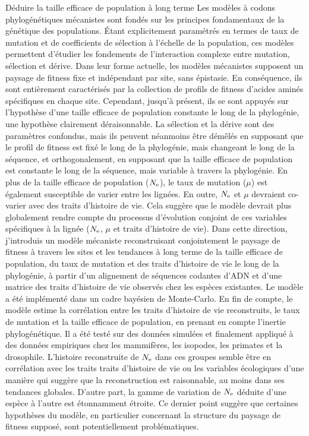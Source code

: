 Déduire la taille efficace de population à long terme
Les modèles à codons phylogénétiques mécanistes sont fondés sur les principes fondamentaux de la génétique des populations.
Étant explicitement paramétrés en termes de taux de mutation et de coefficients de sélection à l'échelle de la population, ces modèles permettent d’étudier les fondements de l'interaction complexe entre mutation, sélection et dérive.
Dans leur forme actuelle, les modèles mécanistes supposent un paysage de fitness fixe et indépendant par site, sans épistasie.
En conséquence, ils sont entièrement caractérisés par la collection de profils de fitness d'acides aminés spécifiques en chaque site.
Cependant, jusqu'à présent, ils se sont appuyés sur l'hypothèse d'une taille efficace de population constante le long de la phylogénie, une hypothèse clairement déraisonnable.
La sélection et la dérive sont des paramètres confondus, mais ils peuvent néanmoins être démêlés en supposant que le profil de fitness est fixé le long de la phylogénie, mais changeant le long de la séquence, et orthogonalement, en supposant que la taille efficace de population est constante le long de la séquence, mais variable à travers la phylogénie.
En plus de la taille efficace de population ($N_{\textrm{e}}$), le taux de mutation ($\mu$) est également susceptible de varier entre les lignées.
En outre, $N_{\textrm{e}}$ et $\mu$ devraient co-varier avec des traits d’histoire de vie.
Cela suggère que le modèle devrait plus globalement rendre compte du processus d'évolution conjoint de ces variables spécifiques à la lignée ($N_{\textrm{e}}$, $\mu$ et traits d’histoire de vie).
Dans cette direction, j'introduis un modèle mécaniste reconstruisant conjointement le paysage de fitness à travers les sites et les tendances à long terme de la taille efficace de population, du taux de mutation et des traits d'histoire de vie le long de la phylogénie, à partir d'un alignement de séquences codantes d'ADN et d'une matrice des traits d’histoire de vie observés chez les espèces existantes.
Le modèle a été implémenté dans un cadre bayésien de Monte-Carlo.
En fin de compte, le modèle estime la corrélation entre les traits d'histoire de vie reconstruits, le taux de mutation et la taille efficace de population, en prenant en compte l'inertie phylogénétique.
Il a été testé sur des données simulées et finalement appliqué à des données empiriques chez les mammifères, les isopodes, les primates et la drosophile.
L'histoire reconstruite de $N_{\textrm{e}}$ dans ces groupes semble être en corrélation avec les traits traits d’histoire de vie ou les variables écologiques d'une manière qui suggère que la reconstruction est raisonnable, au moins dans ses tendances globales.
D'autre part, la gamme de variation de $N_{\textrm{e}}$ déduite d'une espèce à l'autre est étonnamment étroite.
Ce dernier point suggère que certaines hypothèses du modèle, en particulier concernant la structure du paysage de fitness supposé, sont potentiellement problématiques.

